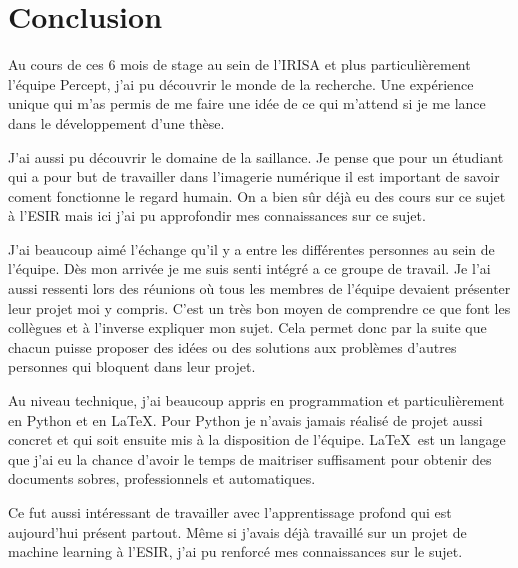 \chapter{Conclusion}
\par
Au cours de ces 6 mois de stage au sein de l'IRISA et plus particulièrement l'équipe Percept, j'ai pu découvrir le monde de la recherche. Une expérience unique qui m'as permis de me faire une idée de ce qui m'attend si je me lance dans le développement d'une thèse.
\par
J'ai aussi pu découvrir le domaine de la saillance. Je pense que pour un étudiant qui a pour but de travailler dans l'imagerie numérique il est important de savoir coment fonctionne le regard humain. On a bien sûr déjà eu des cours sur ce sujet à l'ESIR mais ici j'ai pu approfondir mes connaissances sur ce sujet.
\par
J'ai beaucoup aimé l'échange qu'il y a entre les différentes personnes au sein de l'équipe. Dès mon arrivée je me suis senti intégré a ce groupe de travail. Je l'ai aussi ressenti lors des réunions où tous les membres de l'équipe devaient présenter leur projet moi y compris. C'est un très bon moyen de comprendre ce que font les collègues et à l'inverse expliquer mon sujet. Cela permet donc par la suite que chacun puisse proposer des idées ou des solutions aux problèmes d'autres personnes qui bloquent dans leur projet.
\par
Au niveau technique, j'ai beaucoup appris en programmation et particulièrement en Python et en \LaTeX. Pour Python je n'avais jamais réalisé de projet aussi concret et qui soit ensuite mis à la disposition de l'équipe. \LaTeX\ est un langage que j'ai eu la chance d'avoir le temps de maitriser suffisament pour obtenir des documents sobres, professionnels et automatiques.
\par
Ce fut aussi intéressant de travailler avec l'apprentissage profond qui est aujourd'hui présent partout. Même si j'avais déjà travaillé sur un projet de machine learning à l'ESIR, j'ai pu renforcé mes connaissances sur le sujet.